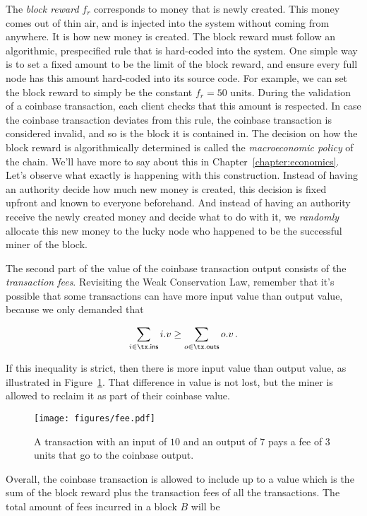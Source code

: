 The \emph{block reward} $f_r$ corresponds
to money that is newly created. This money comes out of thin air, and is injected into the system
without coming from anywhere. It is how new money is created. The block reward must follow an
algorithmic, prespecified rule that is hard-coded into the system. One simple way is to set a fixed
amount to be the limit of the block reward, and ensure every full node has this amount hard-coded
into its source code. For example, we can set the block reward to simply be the constant $f_r = 50$ units.
During the validation of a coinbase transaction, each client checks that this
amount is respected. In case the coinbase transaction deviates from this rule, the coinbase transaction
is considered invalid, and so is the block it is contained in. The decision on how the block reward
is algorithmically determined is called the \emph{macroeconomic policy} of the chain. We'll have
more to say about this in Chapter~\ref{chapter:economics}. Let's observe what exactly is happening
with this construction. Instead of having an authority decide how much new money is created, this
decision is fixed upfront and known to everyone beforehand. And instead of having an authority
receive the newly created money and decide what to do with it, we \emph{randomly} allocate this
new money to the lucky node who happened to be the successful miner of the block.

The second part of the value of the coinbase transaction output consists of the \emph{transaction fees}.
Revisiting the Weak Conservation Law, remember that it's possible that some transactions can have
more input value than output value, because we only demanded that

\[
    \sum_{i \in \tx\textsf{.ins}} i.v \geq \sum_{o \in \tx\textsf{.outs}} o.v\,.
\]

If this inequality is strict, then there is more input value than output value, as illustrated
in Figure~\ref{fig.fee}. That difference in value
is not lost, but the miner is allowed to reclaim it as part of their coinbase value.

\begin{figure}[h]
    \centering
    \texttt{[image: figures/fee.pdf]}
    \caption{A transaction with an input of $10$ and an output of $7$ pays a fee of $3$ units that
             go to the coinbase output.}
    \label{fig.fee}
\end{figure}

Overall, the coinbase transaction is allowed to include up to a value which is the sum of
the block reward plus the transaction fees of all the transactions. The total amount of fees
incurred in a block $B$ will be


